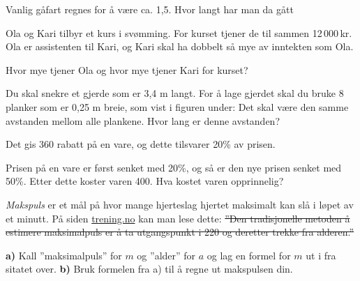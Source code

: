 



\opgt
\nes
{}
Vanlig gåfart regnes for å være ca. 1,5. Hvor langt har man da gått

Ola og Kari tilbyr et kurs i svømming. For kurset tjener de til sammen 12\,000\,kr. Ola er assistenten til Kari, og Kari skal ha dobbelt så mye av inntekten som Ola. \os

Hvor mye tjener Ola og hvor mye tjener Kari for kurset?

Du skal snekre et gjerde som er 3,4 m langt. For å lage gjerdet skal du bruke 8 planker som er 0,25 m breie, som vist i figuren under:
Det skal være den samme avstanden mellom alle plankene. Hvor lang er denne avstanden?

 \vs
{}

 \vs
{}

Det gis 360 rabatt på en vare, og dette tilsvarer 20\% av prisen.

Prisen på en vare er først senket med 20\%, og så er den nye prisen senket med 50\%. Etter dette koster varen 400. Hva kostet varen opprinnelig?

\textit{Makspuls} er et mål på hvor mange hjerteslag hjertet maksimalt kan slå i løpet av et minutt. På siden \href{http://www.trening.no/utholdenhet/ny-formel-for-beregning-av-makspuls/}{\color{blue}trening.no} kan man lese dette:\os
\st{''Den tradisjonelle metoden å estimere maksimalpuls er å ta utgangspunkt i 220 og deretter trekke fra alderen.''}

\textbf{a)} Kall ''maksimalpuls'' for $ m $ og ''alder'' for $ a $ og lag en formel for $ m $ ut i fra sitatet over. \os
\textbf{b)} Bruk formelen fra a) til å regne ut makspulsen din.\vsk

